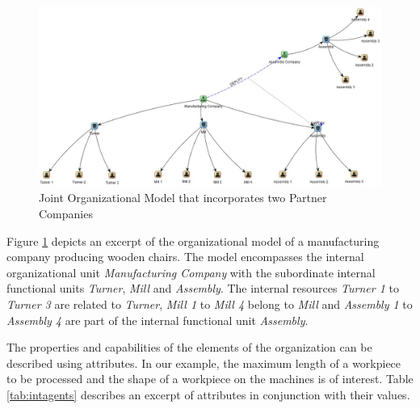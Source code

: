 

\begin{figure}[htb!]
	\centering
	\includegraphics[width=\textwidth]{Figures/orgamodelfed.jpg}
	\caption[Joint Organizational Model that incorporates two Partner Companies]{Joint Organizational Model that incorporates two Partner Companies}
	\label{fig:federation}
\end{figure}

Figure \ref{fig:federation} depicts an excerpt of the organizational model of a manufacturing company producing wooden chairs. The model encompasses the internal organizational unit \emph{Manufacturing Company} with the subordinate internal functional units \emph{Turner}, \emph{Mill} and \emph{Assembly}. The internal resources \emph{Turner 1} to \emph{Turner 3} are related to \emph{Turner}, \emph{Mill 1} to \emph{Mill 4} belong to \emph{Mill} and \emph{Assembly 1} to \emph{Assembly 4} are part of the internal functional unit \emph{Assembly}. 

The properties and capabilities of the elements of the organization can be described using attributes. In our example, the maximum length of a workpiece to be processed and the shape of a workpiece on the machines is of interest.
Table \ref{tab:intagents}  describes an excerpt of attributes in conjunction with their values. 

